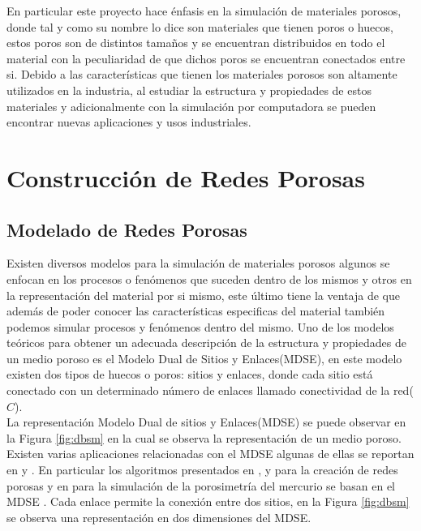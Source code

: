 En particular este proyecto hace énfasis en la simulación de materiales porosos, donde tal y como su nombre lo dice son materiales que tienen poros o huecos, estos poros son de distintos tamaños y se encuentran distribuidos en todo el material con la peculiaridad de que dichos poros se encuentran conectados entre si. Debido a las características que tienen los materiales porosos son altamente utilizados en la industria, al estudiar la estructura y propiedades de estos materiales y adicionalmente con la simulación por computadora se pueden encontrar nuevas aplicaciones y usos industriales.\\

\section{Construcción de Redes Porosas}
\label{sec:costruction}

\subsection{Modelado de Redes Porosas}
\label{subsec:model}
Existen diversos modelos para la simulación de materiales porosos algunos se enfocan en los procesos o fenómenos que suceden dentro de los mismos y otros en la representación del material por si mismo, este último tiene la ventaja de que además de poder conocer las características especificas del material también podemos simular procesos y fenómenos dentro del mismo. Uno de los modelos teóricos para obtener un adecuada descripción de la estructura y propiedades de un medio poroso es el Modelo Dual de Sitios y Enlaces(MDSE)\cite{ref2}, en este modelo existen dos tipos de huecos o poros: sitios y enlaces, donde cada sitio está conectado con un determinado número de enlaces llamado conectividad de la red($C$).\\

La representación Modelo Dual de sitios y Enlaces(MDSE) se puede observar en la Figura \ref{fig:dbsm} en la cual se observa la representación de un medio poroso. Existen varias aplicaciones relacionadas con el MDSE algunas de ellas se reportan en \cite{ref8} y \cite{ref10}. En particular los algoritmos presentados en \cite{ref2}, \cite{ref3} y \cite{ref4} para la creación de redes porosas y en \cite{ref7} para la simulación de la porosimetría del mercurio se basan en el MDSE \cite{ref1}. Cada enlace permite la conexión entre dos sitios, en la Figura \ref{fig:dbsm} se observa una representación en dos dimensiones del MDSE.

